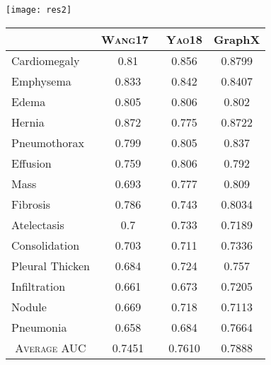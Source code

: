 \documentclass[runningheads]{llncs}
\begin{document}
\begin{table}[t!]
	\begin{minipage}{0.32\linewidth}
		\centering
		\texttt{[image: res2]}
\label{ }
	\end{minipage}
		\begin{minipage}{0.6\linewidth}
		\label{table:compre1}
		\centering
    \begin{tabular}{|l|c|c|c|}
    \hline
    \rowcolor[HTML]{EFEFEF}
    \multicolumn{1}{|c|}{\cellcolor[HTML]{EFEFEF}\textsc{Pathology}} & \textsc{Wang17}~\cite{wang2017chestx} & \textsc{Yao18}\cite{yao2018weakly} & GraphX \\ \hline
    Cardiomegaly & 0.81 & 0.856 & \cellcolor[HTML]{9AFF99}0.8799 \\ \hline
    Emphysema & 0.833 & \cellcolor[HTML]{9AFF99}0.842 & 0.8407 \\ \hline
    Edema & 0.805 & \cellcolor[HTML]{9AFF99}0.806 & 0.802 \\ \hline
    Hernia & 0.872 & 0.775 & \cellcolor[HTML]{9AFF99}0.8722 \\ \hline
    Pneumothorax & 0.799 & 0.805 & \cellcolor[HTML]{9AFF99}0.837 \\ \hline
    Effusion & 0.759 & \cellcolor[HTML]{9AFF99}0.806 & 0.792 \\ \hline
    Mass & 0.693 & 0.777 & \cellcolor[HTML]{9AFF99}0.809 \\ \hline
    Fibrosis & 0.786 & 0.743 & \cellcolor[HTML]{9AFF99}0.8034 \\ \hline
    Atelectasis & 0.7 & \cellcolor[HTML]{9AFF99}0.733 & 0.7189 \\ \hline
    Consolidation & 0.703 & 0.711 & \cellcolor[HTML]{9AFF99}0.7336 \\ \hline
    Pleural Thicken & 0.684 & 0.724 & \cellcolor[HTML]{9AFF99}0.757 \\ \hline
    Infiltration & 0.661 & 0.673 & \cellcolor[HTML]{9AFF99}0.7205 \\ \hline
    Nodule & 0.669 & \cellcolor[HTML]{9AFF99}0.718 & 0.7113 \\ \hline
    Pneumonia & 0.658 & 0.684 & \cellcolor[HTML]{9AFF99}0.7664 \\ \hline\hline
    \multicolumn{1}{|c|}{\textsc{Average} AUC} & 0.7451 & 0.7610 & \cellcolor[HTML]{9AFF99}0.7888 \\ \hline
    \end{tabular}
\end{minipage}
\end{table}
\end{document}
